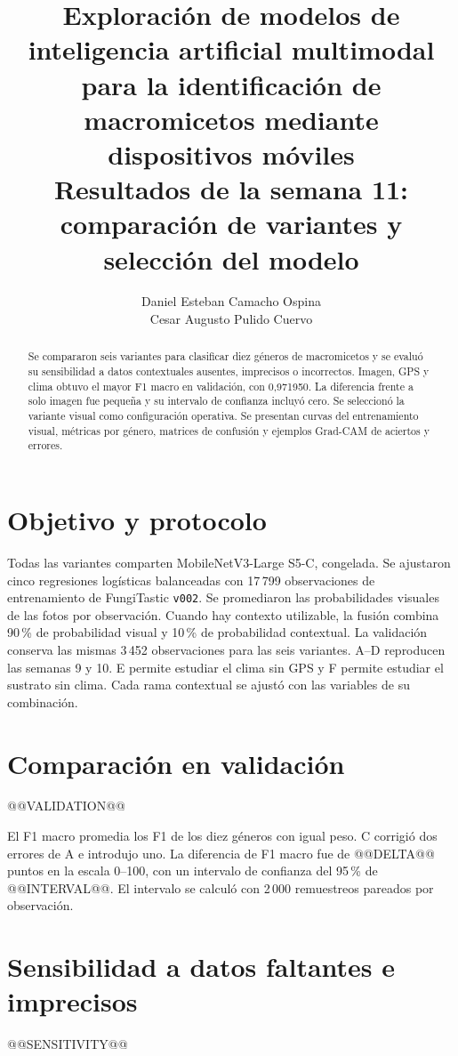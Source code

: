 \documentclass[11pt,a4paper]{article}
\title{\textbf{Exploración de modelos de inteligencia artificial multimodal\\
para la identificación de macromicetos mediante dispositivos móviles}\\[0.6em]
\normalsize Resultados de la semana 11: comparación de variantes y selección del modelo}
\author{Daniel Esteban Camacho Ospina\\Cesar Augusto Pulido Cuervo}
\date{}
\begin{document}
\maketitle

\begin{abstract}
Se compararon seis variantes para clasificar diez géneros de macromicetos y se
evaluó su sensibilidad a datos contextuales ausentes, imprecisos o incorrectos.
Imagen, GPS y clima obtuvo el mayor F1 macro en validación, con 0,971950.
La diferencia frente a solo imagen fue pequeña y su intervalo de confianza
incluyó cero. Se seleccionó la variante visual como configuración operativa.
Se presentan curvas del entrenamiento visual, métricas por género, matrices
de confusión y ejemplos Grad-CAM de aciertos y errores.
\end{abstract}

\section{Objetivo y protocolo}
Todas las variantes comparten MobileNetV3-Large S5-C, congelada. Se ajustaron
cinco regresiones logísticas balanceadas con 17\,799 observaciones de
entrenamiento de FungiTastic \texttt{v002}. Se promediaron las probabilidades
visuales de las fotos por observación. Cuando hay contexto utilizable, la
fusión combina 90\,\% de probabilidad visual y 10\,\% de probabilidad contextual.
La validación conserva las mismas 3\,452 observaciones para las seis variantes.
A--D reproducen las semanas 9 y 10. E permite estudiar el clima sin GPS y F
permite estudiar el sustrato sin clima. Cada rama contextual se ajustó con las
variables de su combinación.

\section{Comparación en validación}
@@VALIDATION@@

\clearpage
El F1 macro promedia los F1 de los diez géneros con igual peso. C corrigió dos
errores de A e introdujo uno. La diferencia de F1 macro fue de
@@DELTA@@ puntos en la escala 0--100, con un intervalo de confianza del
95\,\% de @@INTERVAL@@. El intervalo se calculó con 2\,000 remuestreos pareados
por observación.

\section{Sensibilidad a datos faltantes e imprecisos}
@@SENSITIVITY@@
\end{document}
